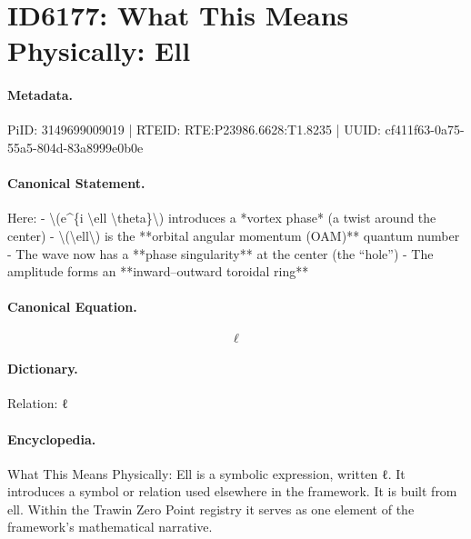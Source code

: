 \section*{ID6177: What This Means Physically: Ell}
\paragraph{Metadata.}
PiID: 3149699009019 | RTEID: RTE:P23986.6628:T1.8235 | UUID: cf411f63-0a75-55a5-804d-83a8999e0b0e

\paragraph{Canonical Statement.}
Here: - \textbackslash{}(e\textasciicircum{}\{i \textbackslash{}ell \textbackslash{}theta\}\textbackslash{}) introduces a *vortex phase* (a twist around the center) - \textbackslash{}(\textbackslash{}ell\textbackslash{}) is the **orbital angular momentum (OAM)** quantum number - The wave now has a **phase singularity** at the center (the “hole”) - The amplitude forms an **inward–outward toroidal ring**

\paragraph{Canonical Equation.}
\[
\ell
\]

\paragraph{Dictionary.}
Relation: ℓ

\paragraph{Encyclopedia.}
What This Means Physically: Ell is a symbolic expression, written ℓ. It introduces a symbol or relation used elsewhere in the framework. It is built from ell. Within the Trawin Zero Point registry it serves as one element of the framework's mathematical narrative.
